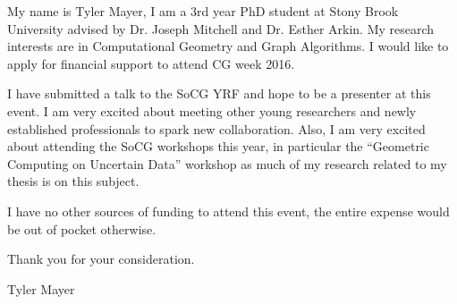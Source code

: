 \documentclass[11pt, oneside]{article}
\begin{document}
My name is Tyler Mayer, I am a 3rd year PhD student  at Stony Brook University advised by Dr. Joseph Mitchell and Dr. Esther Arkin.  My research interests are in Computational Geometry and Graph Algorithms.  I would like to apply for financial support to attend CG week 2016.

I have submitted a talk to the SoCG YRF and hope to be a presenter at this event.   I am very excited about meeting other young researchers and newly established professionals to spark new collaboration.   Also, I am very excited about attending the SoCG workshops this year, in particular the ``Geometric Computing on Uncertain Data'' workshop as much of my research related to my thesis is on this subject.

I have no other sources of funding to attend this event, the entire expense would be out of pocket otherwise.


Thank you for your consideration.


Tyler Mayer
\end{document}
